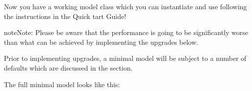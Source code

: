 \documentclass[letterpaper,10pt,english]{sphinxmanual}
\begin{document}
\sphinxAtStartPar
Now you have a working model class which you can instantiate and use following the instructions in the Quick tart Guide!

\begin{sphinxadmonition}{note}{Note:}
\sphinxAtStartPar
Please be aware that the performance is going to be significantly worse than what can be achieved by implementing the
upgrades below.
\end{sphinxadmonition}

\sphinxAtStartPar
Prior to implementing upgrades, a minimal model will be subject to a number of defaults which are discussed in the {\hyperref[\detokenize{user_guide/defaults:defaults}]{}} section.

\sphinxAtStartPar
The full minimal model looks like this:
\end{document}
